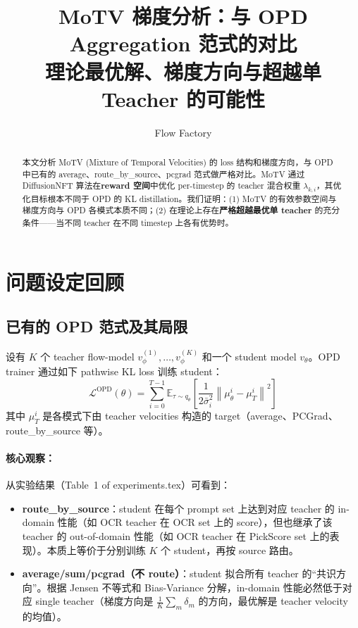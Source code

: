 \documentclass[11pt,a4paper]{article}
\title{\textbf{MoTV 梯度分析：与 OPD Aggregation 范式的对比}\\[0.3em]
\large 理论最优解、梯度方向与超越单 Teacher 的可能性}
\author{Flow Factory}
\date{}
\newcommand{\loss}{\mathcal{L}}
\newcommand{\E}{\mathbb{E}}
\newcommand{\vtheta}{v_\theta}
\newcommand{\vphi}{v_\phi}
\newcommand{\mutheta}{\mu_\theta}
\newcommand{\sigbar}{\bar{\sigma}}
\theoremstyle{definition}
\begin{document}
\maketitle

\begin{abstract}
本文分析 MoTV (Mixture of Temporal Velocities) 的 loss 结构和梯度方向，与 OPD 中已有的 average、route\_by\_source、pcgrad 范式做严格对比。MoTV 通过 DiffusionNFT 算法在\textbf{reward 空间}中优化 per-timestep 的 teacher 混合权重 $\lambda_{k,i}$，其优化目标根本不同于 OPD 的 KL distillation。我们证明：(1) MoTV 的有效参数空间与梯度方向与 OPD 各模式本质不同；(2) 在理论上存在\textbf{严格超越最优单 teacher} 的充分条件——当不同 teacher 在不同 timestep 上各有优势时。
\end{abstract}

\tableofcontents
\newpage

\section{问题设定回顾}

\subsection{已有的 OPD 范式及其局限}

设有 $K$ 个 teacher flow-model $\vphi^{(1)}, \ldots, \vphi^{(K)}$ 和一个 student model $\vtheta$。OPD trainer 通过如下 pathwise KL loss 训练 student：
\begin{equation}
\loss^{\mathrm{OPD}}(\theta) = \sum_{i=0}^{T-1} \E_{\tau \sim q_\theta}\!\left[\frac{1}{2\sigbar_i^2}\left\|\mutheta^i - \mu_T^i\right\|^2\right]
\label{eq:opd_loss}
\end{equation}
其中 $\mu_T^i$ 是各模式下由 teacher velocities 构造的 target（average、PCGrad、route\_by\_source 等）。

\paragraph{核心观察：}从实验结果（Table~1 of experiments.tex）可看到：
\begin{itemize}[leftmargin=1.5em]
\item \textbf{route\_by\_source}：student 在每个 prompt set 上达到对应 teacher 的 in-domain 性能（如 OCR teacher 在 OCR set 上的 score），但也继承了该 teacher 的 out-of-domain 性能（如 OCR teacher 在 PickScore set 上的表现）。本质上等价于分别训练 $K$ 个 student，再按 source 路由。
\item \textbf{average/sum/pcgrad（不 route）}：student 拟合所有 teacher 的``共识方向''。根据 Jensen 不等式和 Bias-Variance 分解，in-domain 性能必然低于对应 single teacher（梯度方向是 $\frac{1}{K}\sum_m \delta_m$ 的方向，最优解是 teacher velocity 的均值）。
\end{itemize}
\end{document}
